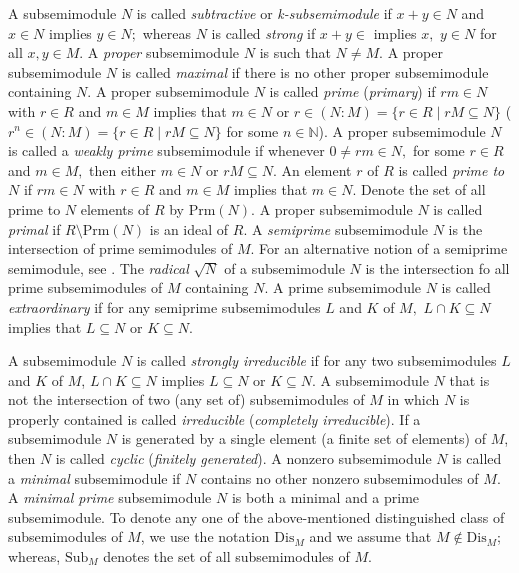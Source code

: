 \documentclass[12pt,english]{smfart}
\theoremstyle{definition}
\begin{document}
A subsemimodule $N$ is called \emph{subtractive} or \emph{k-subsemimodule} \cite{G99} if $x+y\in N$ and $x\in N$ implies $y\in N;$ whereas $N$ is called \emph{strong} \cite{G99} if $x+y\in $ implies $x,$ $y\in N$ for all $x, y\in M$. A \emph{proper} subsemimodule $N$ is such that $N\neq M.$ A proper subsemimodule $N$ is called \emph{maximal} \cite{Y10} if there is no other proper subsemimodule containing $N$. A proper
subsemimodule $N$  is called \emph{prime} \cite{Y10, YOT10} (\emph{primary}) \cite{AK10, TZ13} if $rm \in N$ with
$r \in R$ and $m \in M$ implies that $m \in N$ or $r \in (N : M)=\{r\in R\mid rM\subseteq N \}$ ($r^n \in (N : M)=\{r\in R\mid rM\subseteq N \}$ for some $n\in \mathds{N}$). A proper subsemimodule $N$ is called a \emph{weakly prime} \cite{BM14} subsemimodule if whenever $0\neq rm \in N,$ for some $r \in R$ and $m \in M,$ then either $m \in N$ or
$rM\subseteq N.$ An element $r$ of $R$ is called \emph{prime to $N$} if $rm \in N$ with
$r \in R$ and $m \in M$ implies that $m \in N$. Denote the set of all prime to $N$ elements of $R$ by $\mathrm{Prm}(N).$ A proper subsemimodule $N$ is called \emph{primal} \cite{BM14} if $R\setminus \mathrm{Prm}(N)$ is an ideal of $R$. A \emph{semiprime} subsemimodule $N$ is the intersection of prime semimodules of $M$. For an alternative notion of a semiprime semimodule, see \cite{TZ13}.  The \emph{radical} \cite{AK10} $\sqrt{N}$ of a subsemimodule $N$ is the intersection fo all prime subsemimodules of $M$ containing $N$. A prime subsemimodule $N$ is called \emph{extraordinary} \cite{HPH21} if for any semiprime subsemimodules $L$ and $K$ of $M,$ $L \cap K \subseteq  N$
implies that $L \subseteq  N$ or $K \subseteq N.$ 

A subsemimodule $N$ is called \emph{strongly irreducible} if for any two subsemimodules $L$ and $K$ of $M$, $L\cap K\subseteq N$ implies $L\subseteq N$ or $K\subseteq N.$  A subsemimodule $N$  that is not the intersection of two (any set of) subsemimodules of $M$ in which $N$ is properly contained is called \emph{irreducible} (\emph{completely irreducible}). If a subsemimodule $N$ is generated by a single  element (a finite set of elements) of $M$, then $N$ is called  \emph{cyclic} (\emph{finitely generated}). A nonzero subsemimodule $N$ is called a \emph{minimal} subsemimodule if $N$ contains no other nonzero subsemimodules of $M.$ A \emph{minimal prime} subsemimodule $N$ is both a minimal and a prime subsemimodule. To denote any one of the above-mentioned distinguished class of subsemimodules of $M$, we use the notation $\mathrm{Dis}_M$ and we assume that $M\notin \mathrm{Dis}_M$; whereas, $\mathrm{Sub}_M$ denotes the set of all subsemimodules of $M$.
\end{document}
